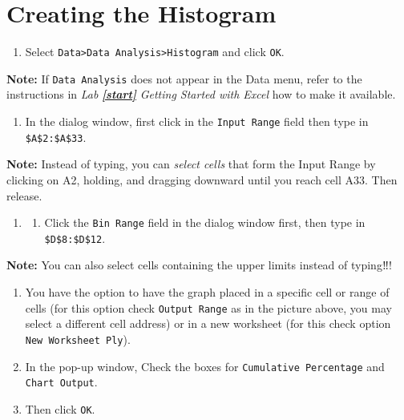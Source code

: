 \documentclass[
]{book}
\providecommand{\tightlist}{%
  \setlength{\itemsep}{0pt}\setlength{\parskip}{0pt}}
\begin{document}
\hypertarget{creating-the-histogram}{%
\section{Creating the Histogram}\label{creating-the-histogram}}

\begin{enumerate}
\def\labelenumi{\arabic{enumi}.}
\tightlist
\item
  Select \texttt{Data\textgreater{}Data\ Analysis\textgreater{}Histogram} and click \texttt{OK}.
\end{enumerate}

\textbf{Note:} If \texttt{Data\ Analysis} does not appear in the Data menu, refer to the instructions in \emph{Lab} \textbf{\emph{\ref{start}}} \emph{Getting Started with Excel} how to make it available.

\begin{enumerate}
\def\labelenumi{\arabic{enumi}.}
\setcounter{enumi}{1}
\tightlist
\item
  In the dialog window, first click in the \texttt{Input\ Range} field then type in \texttt{\$A\$2:\$A\$33}.
\end{enumerate}

\textbf{Note:} Instead of typing, you can \emph{select cells} that form the Input Range by clicking on A2, holding, and dragging downward until you reach cell A33. Then release.

\begin{enumerate}
\def\labelenumi{\arabic{enumi}.}
\setcounter{enumi}{2}
\item
  \begin{enumerate}
  \def\labelenumii{\arabic{enumii})}
  \setcounter{enumii}{2}
  \tightlist
  \item
    Click the \texttt{Bin\ Range} field in the dialog window first, then type in \texttt{\$D\$8:\$D\$12}.
  \end{enumerate}
\end{enumerate}

\textbf{Note:} You can also select cells containing the upper limits instead of typing‼!

\begin{enumerate}
\def\labelenumi{\arabic{enumi}.}
\setcounter{enumi}{3}
\tightlist
\item
  You have the option to have the graph placed in a specific cell or range of cells (for this option check \texttt{Output\ Range} as in the picture above, you may select a different cell address) or in a new worksheet (for this check option \texttt{New\ Worksheet\ Ply}).
\item
  In the pop-up window, Check the boxes for \texttt{Cumulative\ Percentage} and \texttt{Chart\ Output}.
\item
  Then click \texttt{OK}.
\end{enumerate}
\end{document}
